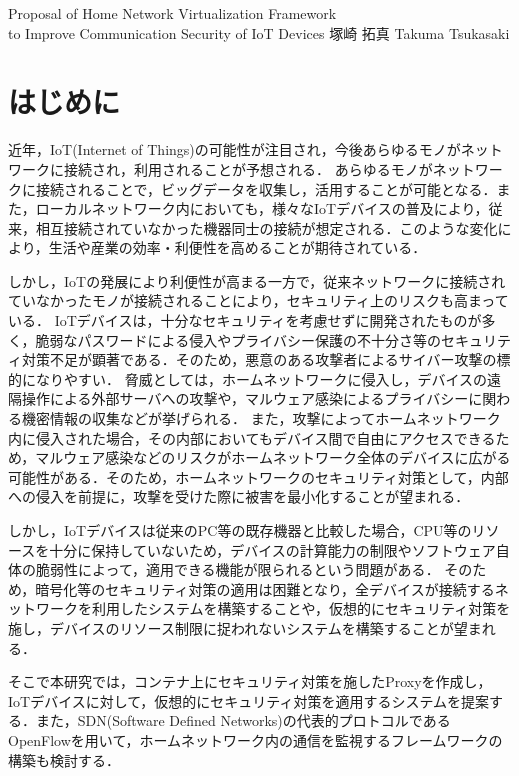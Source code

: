 \documentclass[a4paper,10pt,twocolumn,uplatex]{jsarticle}
\date{11}
\begin{document}
{Proposal of Home Network Virtualization Framework\\to Improve Communication Security of IoT Devices}
{塚崎 拓真}
{Takuma Tsukasaki}

\section{はじめに}
近年，IoT(Internet of Things)の可能性が注目され，今後あらゆるモノがネットワークに接続され，利用されることが予想される\cite{num}．
あらゆるモノがネットワークに接続されることで，ビッグデータを収集し，活用することが可能となる．また，ローカルネットワーク内においても，様々なIoTデバイスの普及により，従来，相互接続されていなかった機器同士の接続が想定される．このような変化により，生活や産業の効率・利便性を高めることが期待されている\cite{expect}．\par
しかし，IoTの発展により利便性が高まる一方で，従来ネットワークに接続されていなかったモノが接続されることにより，セキュリティ上のリスクも高まっている\cite{security}．
IoTデバイスは，十分なセキュリティを考慮せずに開発されたものが多く，脆弱なパスワードによる侵入やプライバシー保護の不十分さ等のセキュリティ対策不足が顕著である\cite{owasp}．そのため，悪意のある攻撃者によるサイバー攻撃の標的になりやすい．
脅威としては，ホームネットワークに侵入し，デバイスの遠隔操作による外部サーバへの攻撃や，マルウェア感染によるプライバシーに関わる機密情報の収集などが挙げられる．
また，攻撃によってホームネットワーク内に侵入された場合，その内部においてもデバイス間で自由にアクセスできるため，マルウェア感染などのリスクがホームネットワーク全体のデバイスに広がる可能性がある．そのため，ホームネットワークのセキュリティ対策として，内部への侵入を前提に，攻撃を受けた際に被害を最小化することが望まれる．\par
しかし，IoTデバイスは従来のPC等の既存機器と比較した場合，CPU等のリソースを十分に保持していない\cite{camera}ため，デバイスの計算能力の制限やソフトウェア自体の脆弱性によって，適用できる機能が限られるという問題がある\cite{disap}．
そのため，暗号化等のセキュリティ対策の適用は困難となり，全デバイスが接続するネットワークを利用したシステムを構築することや，仮想的にセキュリティ対策を施し，デバイスのリソース制限に捉われないシステムを構築することが望まれる．\par
そこで本研究では，コンテナ上にセキュリティ対策を施したProxyを作成し，IoTデバイスに対して，仮想的にセキュリティ対策を適用するシステムを提案する．また，SDN(Software Defined Networks)の代表的プロトコルであるOpenFlow\cite{openflow}を用いて，ホームネットワーク内の通信を監視するフレームワークの構築も検討する．
\end{document}
